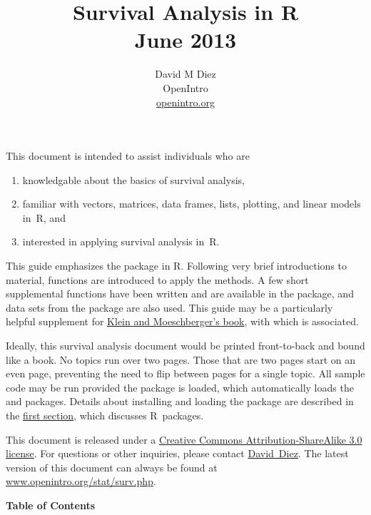 \documentclass[11pt]{article}
\title{Survival Analysis in R \vspace{1mm} \\ \small{June 2013}\vspace{-3mm}}
\author{%
David M Diez \\ OpenIntro \\ \href{http://www.openintro.org}{openintro.org}} %
\date{}
\newcommand{\R}[1]{\textsf{R}}
\begin{document}
\maketitle \vspace{-3mm}

This document is intended to assist individuals who are
\begin{enumerate}
\setlength{\itemsep}{-1mm}
\item knowledgable about the basics of survival analysis,
\item familiar with vectors, matrices, data frames, lists, plotting, and linear models in~\R{}, and
\item interested in applying survival analysis in~\R{}.
\end{enumerate}

This guide emphasizes the  package in \R{}. Following very brief introductions to material, functions are introduced to apply the methods. A few short supplemental functions have been written and are available in the  package, and data sets from the  package are also used. This guide may be a particularly helpful supplement for \href{http://www.amazon.com/dp/1441929851}{Klein and Moeschberger's book}, with which  is associated.

Ideally, this survival analysis document would be printed front-to-back and bound like a book. No topics run over two pages. Those that are two pages start on an even page, preventing the need to flip between pages for a single topic. All sample code may be run provided the  package is loaded, which automatically loads the  and  packages. Details about installing and loading the  package are described in the \hyperref[packagesAndData]{first section}, which discusses \R{}~packages.

This document is released under a \href{http://creativecommons.org/licenses/by-sa/3.0/}{Creative Commons Attribution-ShareAlike 3.0 license}. For questions or other inquiries, please contact \href{http://openintro.org/about.php}{David~Diez}. The latest version of this document can always be found at \href{http://www.openintro.org/stat/surv.php}{www.openintro.org/stat/surv.php}.

\vspace{5mm}

\textbf{\large Table of Contents}
\end{document}

